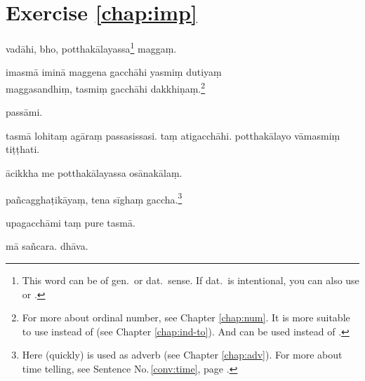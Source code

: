 \section*{Exercise \ref{chap:imp}}
\begin{answerkey}
\item vad\=ahi, bho, potthak\=alayassa\footnote{This word can be of gen.\ or dat.\ sense. If dat.\ is intentional, you can also use  or .} magga\d m.
\item imasm\=a imin\=a maggena gacch\=ahi yasmi\d m dutiya\d m \\maggasandhi\d m, tasmi\d m gacch\=ahi dakkhi\d na\d m.\footnote{For more about ordinal number, see Chapter \ref{chap:num}. It is more suitable to use  instead of  (see Chapter \ref{chap:ind-to}). And  can be used instead of .}
\item pass\=ami.
\item tasm\=a lohita\d m ag\=ara\d m passasissasi. ta\d m atigacch\=ahi. potthak\=alayo v\=amasmi\d m ti\d t\d thati.
\item \=acikkha me potthak\=alayassa os\=anak\=ala\d m.
\item pa\~ncaggha\d tik\=aya\d m, tena s\=igha\d m gaccha.\footnote{Here  (quickly) is used as adverb (see Chapter \ref{chap:adv}). For more about time telling, see Sentence No.\,\ref{conv:time}, page \pageref{conv:time}.}
\item upagacch\=ami ta\d m pure tasm\=a.
\item m\=a sa\~ncara. dh\=ava.
\end{answerkey}

